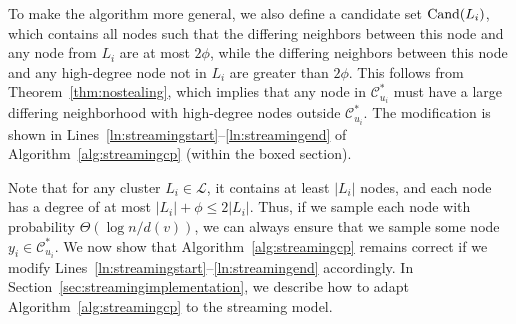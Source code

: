 To make the algorithm more general, we also define a candidate set $\mathrm{Cand}(L_i)$, which contains all nodes such that the differing neighbors between this node and any node from $L_i$ are at most $2\phi$, while the differing neighbors between this node and any high-degree node not in $L_i$ are greater than $2\phi$. This follows from Theorem~\ref{thm:nostealing}, which implies that any node in $\mathcal{C}^*_{u_i}$ must have a large differing neighborhood with high-degree nodes outside $\mathcal{C}^*_{u_i}$. The modification is shown in Lines~\ref{ln:streamingstart}--\ref{ln:streamingend} of Algorithm~\ref{alg:streamingcp} (within the boxed section).


Note that for any cluster $L_i \in \mathcal{L}$, it contains at least $|L_i|$ nodes, and each node has a degree of at most $|L_i| + \phi \leq 2|L_i|$. Thus, if we sample each node with probability $\Theta(\log n / d(v))$, we can always ensure that we sample some node $y_i \in \mathcal{C}^*_{u_i}$. 
We now show that Algorithm~\ref{alg:streamingcp} remains correct if we modify Lines~\ref{ln:streamingstart}--\ref{ln:streamingend} accordingly. In Section~\ref{sec:streamingimplementation}, we describe how to adapt Algorithm~\ref{alg:streamingcp} to the streaming model.



